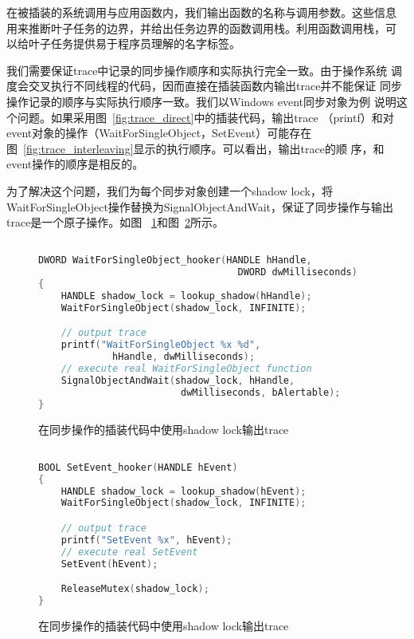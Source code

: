 在被插装的系统调用与应用函数内，我们输出函数的名称与调用参数。这些信息
用来推断叶子任务的边界，并给出任务边界的函数调用栈。利用函数调用栈，可
以给叶子任务提供易于程序员理解的名字标签。


我们需要保证trace中记录的同步操作顺序和实际执行完全一致。由于操作系统
调度会交叉执行不同线程的代码，因而直接在插装函数内输出trace并不能保证
同步操作记录的顺序与实际执行顺序一致。我们以Windows event同步对象为例
说明这个问题。如果采用图~\ref{fig:trace_direct}中的插装代码，输出trace
（printf）和对event对象的操作（WaitForSingleObject，SetEvent）可能存在
图~\ref{fig:trace_interleaving}显示的执行顺序。可以看出，输出trace的顺
序，和event操作的顺序是相反的。

为了解决这个问题，我们为每个同步对象创建一个shadow lock，将
WaitForSingleObject操作替换为SignalObjectAndWait，保证了同步操作与输出
trace是一个原子操作。如图
~\ref{fig:trace_shadowlock1}和图~\ref{fig:trace_shadowlock2}所示。

\begin{figure}[htbp]
\centering
\begin{lstlisting}[language=C++, basicstyle=\small]

DWORD WaitForSingleObject_hooker(HANDLE hHandle, 
                                   DWORD dwMilliseconds)
{
    HANDLE shadow_lock = lookup_shadow(hHandle);
    WaitForSingleObject(shadow_lock, INFINITE);

    // output trace
    printf("WaitForSingleObject %x %d", 
             hHandle, dwMilliseconds);
    // execute real WaitForSingleObject function
    SignalObjectAndWait(shadow_lock, hHandle, 
                         dwMilliseconds, bAlertable);
}
\end{lstlisting}
\caption{在同步操作的插装代码中使用shadow lock输出trace}
\label{fig:trace_shadowlock1}
\end{figure}

\begin{figure}[htbp]
\centering
\begin{lstlisting}[language=C++, basicstyle=\small]

BOOL SetEvent_hooker(HANDLE hEvent)
{
    HANDLE shadow_lock = lookup_shadow(hEvent);
    WaitForSingleObject(shadow_lock, INFINITE);

    // output trace
    printf("SetEvent %x", hEvent);
    // execute real SetEvent
    SetEvent(hEvent);

    ReleaseMutex(shadow_lock);
}

\end{lstlisting}
\caption{在同步操作的插装代码中使用shadow lock输出trace}
\label{fig:trace_shadowlock2}
\end{figure}

